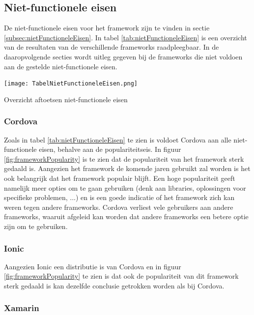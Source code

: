 \subsection{Niet-functionele eisen}
\label{subsec:aftoetsenNietFunctioneleEisen}

De niet-functionele eisen voor het framework zijn te vinden in sectie \ref{subsec:nietFunctioneleEisen}. In tabel \ref{tab:nietFunctioneleEisen} is een overzicht van de resultaten van de verschillende frameworks raadpleegbaar. In de daaropvolgende secties wordt uitleg gegeven bij de frameworks die niet voldoen aan de gestelde niet-functionele eisen.

\begin{table}
    \texttt{[image: TabelNietFunctioneleEisen.png]}
    \caption{Overzicht aftoetsen niet-functionele eisen}
    \label{tab:nietFunctioneleEisen}
\end{table}

\subsubsection{Cordova}
\label{subsubsec:CordovaEisen}

Zoals in tabel \ref{tab:nietFunctioneleEisen} te zien is voldoet Cordova aan alle niet-functionele eisen, behalve aan de populariteitseis. In figuur \ref{fig:frameworkPopularity} is te zien dat de populariteit van het framework sterk gedaald is. Aangezien het framework de komende jaren gebruikt zal worden is het ook belangrijk dat het framework populair blijft. Een hoge populariteit geeft namelijk meer opties om te gaan gebruiken (denk aan libraries, oplossingen voor specifieke problemen, ...) en is een goede indicatie of het framework zich kan weren tegen andere frameworks. Cordova verliest vele gebruikers aan andere frameworks, waaruit afgeleid kan worden dat andere frameworks een betere optie zijn om te gebruiken.

\subsubsection{Ionic}
\label{subsubsec:IonicEisen}

Aangezien Ionic een distributie is van Cordova en in figuur \ref{fig:frameworkPopularity} te zien is dat ook de populariteit van dit framework sterk gedaald is kan dezelfde conclusie getrokken worden als bij Cordova.

\subsubsection{Xamarin}
\label{subsubsec:XamarinEisen}

